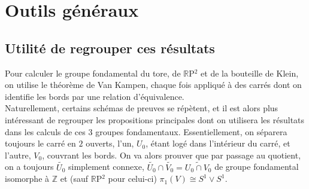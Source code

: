 \section{Outils généraux}

\subsection{Utilité de regrouper ces résultats}
Pour calculer le groupe fondamental du tore, de $\mathbb{R}$P$^2$ et de la bouteille de Klein, on utilise le théorème de Van Kampen, chaque fois appliqué à des carrés dont on identifie les bords par une relation d'équivalence.\medskip\\
Naturellement, certains schémas de preuves se répètent, et il est alors plus intéressant de regrouper les propositions principales dont on utilisera les résultats dans les calculs de ces 3 groupes fondamentaux.
Essentiellement, on séparera toujours le carré en $2$ ouverts, l'un, $U_0$, étant logé dans l'intérieur du carré, et l'autre, $V_0$, couvrant les bords. On va alors prouver que par passage au quotient, on a toujours $\tilde{U_0}$ simplement connexe, $\tilde{U_0}\cap\tilde{V_0}=\widetilde{U_0\cap V_0}$ de groupe fondamental isomorphe à $\mathbb{Z}$ et (sauf $\mathbb{R}$P$^2$ pour celui-ci) $\pi_1(V)\cong S^1\vee S^1$.

